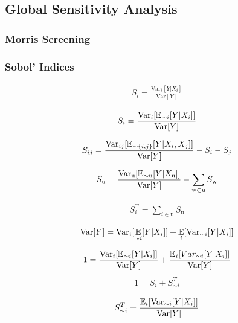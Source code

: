 \subsection{Global Sensitivity Analysis}
\subsubsection{Morris Screening}

\subsubsection{Sobol' Indices}

\begin{align}
S_i = \frac{\text{Var}_i[Y|X_i ]}{\text{Var}[Y]}
\end{align}

\begin{align}
S_i = \frac{\text{Var}_i[\operatorname*{\mathbb{E}}_{\sim i}[Y|X_i ]]}{\text{Var}[Y]}
\end{align}

\begin{align}
S_{ij} = \frac{\text{Var}_{ij}[\operatorname*{\mathbb{E}}_{\sim \{i,j\}}[Y|X_i, X_j ]]}{\text{Var}[Y]} - S_i - S_j
\end{align}

\begin{align}
S_\text{u} = \frac{\text{Var}_\text{u}[\operatorname*{\mathbb{E}}_{\sim \text{u}}[Y|X_\text{u} ]]}{\text{Var}[Y]} - \sum_{\text{w} \subset \text{u}} S_\text{w}
\end{align}

\begin{align}
S_i^\text{T} = \sum_{i \in \text{u}} S_\text{u}
\end{align}

\begin{align}
\text{Var}[Y] = \text{Var}_i[\operatorname*{\mathbb{E}}_{\sim i}[Y|X_i]] + \operatorname*{\mathbb{E}}_{i}[\text{Var}_{\sim i}[Y|X_i]]
\end{align}

\begin{align}
1 = \frac{\text{Var}_i[\operatorname*{\mathbb{E}}_{\sim i}[Y|X_i]]}{\text{Var}[Y]} + \frac{\operatorname*{\mathbb{E}}_{i}[Var_{\sim i}[Y|X_i]]}{\text{Var}[Y]}
\end{align}
\begin{align}
1 = S_i + S_{\sim i}^T
\end{align}

\begin{align}
S_{\sim i}^T = \frac{\operatorname*{\mathbb{E}}_{i}[\text{Var}_{\sim i}[Y|X_i]]}{\text{Var}[Y]}
\end{align}

